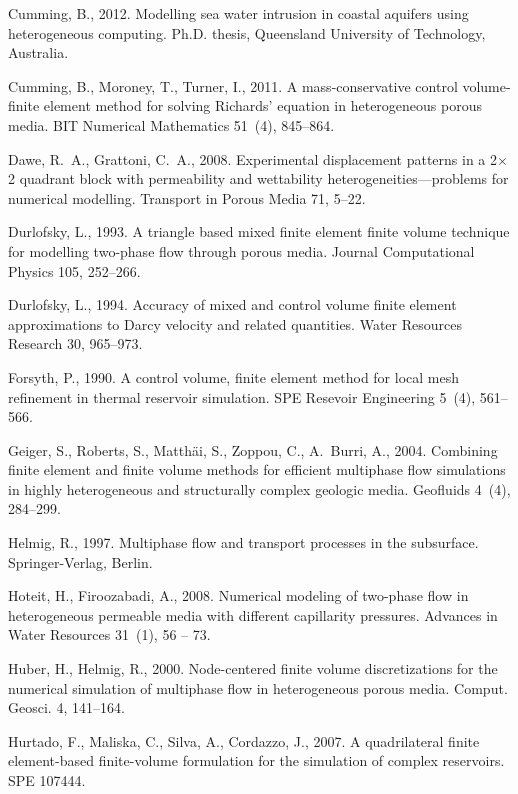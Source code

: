 \documentclass[times]{fldauth}
\begin{document}
\begin{thebibliography}{9}
Cumming, B., 2012. Modelling sea water intrusion in coastal aquifers using
  heterogeneous computing. Ph.D. thesis, Queensland University of Technology,
  Australia.

Cumming, B., Moroney, T., Turner, I., 2011. A mass-conservative control
  volume-finite element method for solving {R}ichards' equation in
  heterogeneous porous media. BIT Numerical Mathematics 51~(4), 845--864.

Dawe, R.~A., Grattoni, C.~A., 2008. Experimental displacement patterns in a
  2$\times$2 quadrant block with permeability and wettability
  heterogeneities—problems for numerical modelling. Transport in Porous Media
  71, 5--22.

Durlofsky, L., 1993. A triangle based mixed finite element finite volume
  technique for modelling two-phase flow through porous media. Journal
  Computational Physics 105, 252--266.

Durlofsky, L., 1994. Accuracy of mixed and control volume finite element
  approximations to {D}arcy velocity and related quantities. Water Resources
  Research 30, 965--973.

Forsyth, P., 1990. A control volume, finite element method for local mesh
  refinement in thermal reservoir simulation. SPE Resevoir Engineering 5~(4),
  561--566.

Geiger, S., Roberts, S., Matth{\"a}i, S., Zoppou, C., A.~Burri, A., 2004.
  Combining finite element and finite volume methods for efficient multiphase
  flow simulations in highly heterogeneous and structurally complex geologic
  media. Geofluids 4~(4), 284--299.

Helmig, R., 1997. Multiphase flow and transport processes in the subsurface.
  Springer-Verlag, Berlin.

Hoteit, H., Firoozabadi, A., 2008. Numerical modeling of two-phase flow in
  heterogeneous permeable media with different capillarity pressures. Advances
  in Water Resources 31~(1), 56 -- 73.

Huber, H., Helmig, R., 2000. Node-centered finite volume discretizations for
  the numerical simulation of multiphase flow in heterogeneous porous media.
  Comput. Geosci. 4, 141--164.

Hurtado, F., Maliska, C., Silva, A., Cordazzo, J., 2007. A quadrilateral finite
  element-based finite-volume formulation for the simulation of complex
  reservoirs. SPE 107444.


\end{thebibliography}
\end{document}
